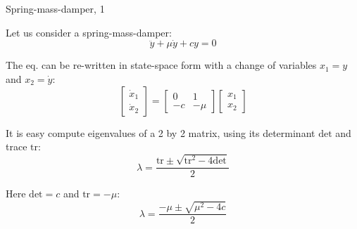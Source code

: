\documentclass{beamer}
\begin{document}
\begin{frame}{Spring-mass-damper, 1}
	\begin{flushleft}
		
		Let us consider a spring-mass-damper:
		\begin{equation}
			\ddot y + \mu \dot y + c y = 0
		\end{equation}
		
		The eq. can be re-written in state-space form with a change of variables $x_1 = y$ and $x_2 = \dot y$:
		\begin{equation}
			\begin{bmatrix}
				\dot x_1 \\ \dot x_2
			\end{bmatrix} 
			= 
			\begin{bmatrix}
				0 & 1 \\ - c & -\mu
			\end{bmatrix}
			\begin{bmatrix}
				x_1 \\ x_2
			\end{bmatrix}
		\end{equation}
		
		
		It is easy compute eigenvalues of a 2 by 2 matrix, using its determinant $\text{det}$ and trace $\text{tr}$:
		\begin{equation}
			\lambda = \frac{\text{tr} \pm \sqrt{\text{tr}^2 - 4 \text{det}}}{2} 
		\end{equation}
		
		Here $\text{det} = c$ and $\text{tr} = -\mu$:
		\begin{equation}
			\lambda = \frac{-\mu \pm \sqrt{\mu^2 - 4 c}}{2} 
		\end{equation}
		
	\end{flushleft}
\end{frame}
\end{document}

